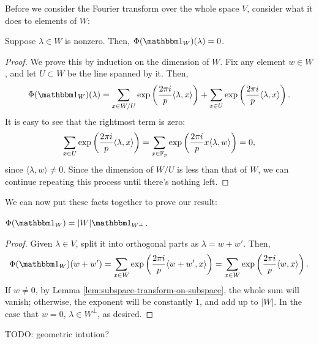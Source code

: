 Before we consider the Fourier transform over the whole space $V$, consider what
it does to elements of $W$:
\begin{lem}
    \label{lem:subspace-transform-on-subspace}
    Suppose $\lambda\in W$ is nonzero. Then, $\Phi(\IND_W)(\lambda) = 0$.
    \begin{proof}
        We prove this by induction on the dimension of $W$. Fix any element $w\in W$,
        and let $U\subset W$ be the line spanned by it. Then,   
        \[ \Phi(\IND_W)(\lambda) = 
            \sum_{x\in W/U} 
                \exp \left(\frac{2\pi i}{p} \langle \lambda, x \rangle\right) +
            \sum_{x\in U} 
                \exp \left(\frac{2\pi i}{p} \langle \lambda, x \rangle\right). \]
        It is easy to see that the rightmost term is zero:
        \[ \sum_{x\in U} 
                \exp \left(\frac{2\pi i}{p} \langle \lambda, x \rangle\right) =
            \sum_{x\in \mathbb{F}_p} 
                \exp \left(\frac{2\pi i}{p} x \langle \lambda, w \rangle\right) = 0,
                \]
        since $\langle \lambda, w \rangle \neq 0$. Since the dimension of $W/U$ is less
        than that of $W$, we can continue repeating this process until there's nothing left.
    \end{proof}
\end{lem}
We can now put these facts together to prove our result:
\begin{thm}
    $\Phi(\IND_W) = |W| \IND_{W^\perp}$.
    \begin{proof}
        Given $\lambda\in V$, split it into orthogonal parts as $\lambda = w + w'$. Then,
        \[ \Phi(\IND_W)(w + w') = 
            \sum_{x\in W} 
                \exp \left(\frac{2\pi i}{p} \langle w + w', x \rangle\right) = 
            \sum_{x\in W} 
                \exp \left(\frac{2\pi i}{p} \langle w, x \rangle\right). \]
        If $w\neq 0$, by Lemma \ref{lem:subspace-transform-on-subspace}, the whole
        sum will vanish; otherwise, the exponent will be constantly $1$, and add up to
        $|W|$. In the case that $w = 0$, $\lambda\in W^\perp$, as desired.
    \end{proof}
\end{thm}
TODO: geometric intution?

